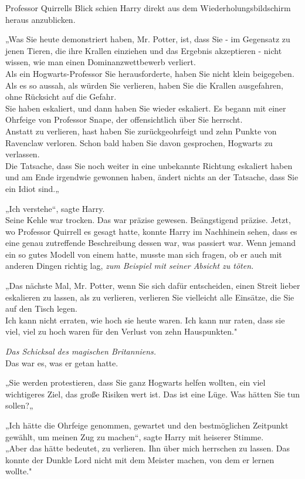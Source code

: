 {Professor Quirrells Blick schien Harry direkt aus dem Wiederholungsbildschirm heraus anzublicken.

„Was Sie heute demonstriert haben, Mr. Potter, ist, dass Sie - im Gegensatz zu jenen Tieren, die ihre Krallen einziehen und das Ergebnis akzeptieren - nicht wissen, wie man einen Dominanzwettbewerb verliert.\\ Als ein Hogwarts-Professor Sie herausforderte, haben Sie nicht klein beigegeben. Als es so aussah, als würden Sie verlieren, haben Sie die Krallen ausgefahren, ohne Rücksicht auf die Gefahr.\\ Sie haben eskaliert, und dann haben Sie wieder eskaliert. Es begann mit einer Ohrfeige von Professor Snape, der offensichtlich über Sie herrscht.\\ Anstatt zu verlieren, hast haben Sie zurückgeohrfeigt und zehn Punkte von Ravenclaw verloren. Schon bald haben Sie davon gesprochen, Hogwarts zu verlassen.\\ Die Tatsache, dass Sie noch weiter in eine unbekannte Richtung eskaliert haben und am Ende irgendwie gewonnen haben, ändert nichts an der Tatsache, dass Sie ein Idiot sind.„

„Ich verstehe“, sagte Harry.\\ Seine Kehle war trocken. Das war präzise gewesen. Beängstigend präzise. Jetzt, wo Professor Quirrell es gesagt hatte, konnte Harry im Nachhinein sehen, dass es eine genau zutreffende Beschreibung dessen war, was passiert war. Wenn jemand ein so gutes Modell von einem hatte, musste man sich fragen, ob er auch mit anderen Dingen richtig lag, \emph{zum Beispiel mit seiner Absicht zu töten.}

„Das nächste Mal, Mr. Potter, wenn Sie sich dafür entscheiden, einen Streit lieber eskalieren zu lassen, als zu verlieren, verlieren Sie vielleicht alle Einsätze, die Sie auf den Tisch legen.\\ Ich kann nicht erraten, wie hoch sie heute waren. Ich kann nur raten, dass sie viel, viel zu hoch waren für den Verlust von zehn Hauspunkten."

\emph{Das Schicksal des magischen Britanniens.}\\ Das war es, was er getan hatte.

„Sie werden protestieren, dass Sie ganz Hogwarts helfen wollten, ein viel wichtigeres Ziel, das große Risiken wert ist. Das ist eine Lüge. Was hätten Sie tun sollen?„

„Ich hätte die Ohrfeige genommen, gewartet und den bestmöglichen Zeitpunkt gewählt, um meinen Zug zu machen“, sagte Harry mit heiserer Stimme.\\ „Aber das hätte bedeutet, zu verlieren. Ihn über mich herrschen zu lassen. Das konnte der Dunkle Lord nicht mit dem Meister machen, von dem er lernen wollte."

}
